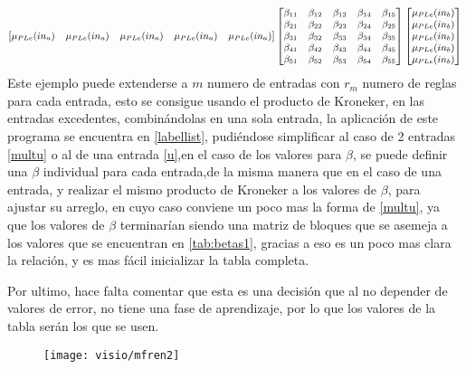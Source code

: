     \begin{equation}
     \small{
    \begin{bmatrix}
    \mu_{PLe}(in_a) & \mu_{PLe}(in_a) & \mu_{PLe}(in_a) & \mu_{PLe}(in_a) & \mu_{PLe}(in_a)
    \end{bmatrix} } \begin{bmatrix}
   \beta_{11} &\beta_{12}  &\beta_{13}  &\beta_{14}  &\beta_{15}  \\ 
   \beta_{21} & \beta_{22} & \beta_{23} & \beta_{24} & \beta_{25} \\ 
   \beta_{31} &\beta_{32}  &\beta_{33}  &\beta_{34}  &\beta_{35}\\
   \beta_{41} &\beta_{42}  &\beta_{43}  &\beta_{44}  &\beta_{45}\\
   \beta_{51} &\beta_{52}  &\beta_{53}  &\beta_{54}  &\beta_{55}    \end{bmatrix}    \begin{bmatrix}
   \mu_{PLe}(in_b) \\ 
    \mu_{PLe}(in_b)\\ 
    \mu_{PLe}(in_b)\\ 
    \mu_{PLe}(in_b)\\ 
    \mu_{PLe}(in_b)
    \end{bmatrix}
    \end{equation}
    Este ejemplo puede extenderse a $m$ numero de entradas con $r_m$ numero de reglas para cada entrada, esto se consigue usando el producto de Kroneker,  en las entradas excedentes, combinándolas en una sola entrada, la aplicación de este programa se encuentra en \cref{labellist}, pudiéndose simplificar al caso de 2 entradas \ref{multu} o al de una entrada \ref{u},en el caso de los valores para $\beta$, se puede definir una $\beta$ individual para cada entrada,de la misma manera que en el caso de una entrada, y realizar el mismo producto de Kroneker a los valores de $\beta$, para ajustar su arreglo, en cuyo caso conviene un poco mas la forma de \cref{multu}, ya que los valores de $\beta$ terminarían siendo una matriz de bloques que se asemeja a los valores que se encuentran en \cref{tab:betas1}, gracias a eso es un poco mas clara la relación, y es mas fácil inicializar la tabla completa.
    
    Por ultimo, hace falta comentar que esta es una decisión que al no depender de valores de error, no tiene una fase de aprendizaje, por lo que los valores de la tabla serán los que se usen.
   
    
    \begin{figure}[h]
    	\centering
    	\texttt{[image: visio/mfren2]}
    	\caption{}
    	\label{fig:mfren2}
    \end{figure}
    

